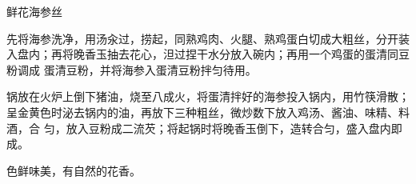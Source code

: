 \begin{recipe}{鲜花海参丝}

\ingredients


\preparation

\step 先将海参洗净，用汤汆过，捞起，同熟鸡肉、火腿、熟鸡蛋白切成大粗丝，分开装
入盘内；再将晚香玉抽去花心，泹过捏干水分放入碗内；再用一个鸡蛋的蛋清同豆粉调成
蛋清豆粉，并将海参入蛋清豆粉拌匀待用。

\step 锅放在火炉上倒下猪油，烧至八成火，将蛋清拌好的海参投入锅内，用竹筷滑散；
呈金黄色时泌去锅内的油，再放下三种粗丝，微炒数下放入鸡汤、酱油、味精、料酒，合
匀，放入豆粉成二流芡；将起锅时将晚香玉倒下，造转合匀，盛入盘内即成。

\features

色鲜味美，有自然的花香。

\end{recipe}

